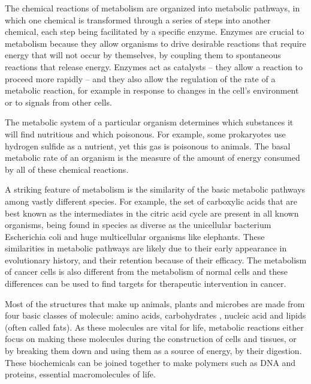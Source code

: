 The chemical reactions of metabolism are organized into metabolic pathways, in which one chemical is transformed through a series of steps into another chemical, each step being facilitated by a specific enzyme. Enzymes are crucial to metabolism because they allow organisms to drive desirable reactions that require energy that will not occur by themselves, by coupling them to spontaneous reactions that release energy. Enzymes act as catalysts -- they allow a reaction to proceed more rapidly -- and they also allow the regulation of the rate of a metabolic reaction, for example in response to changes in the cell's environment or to signals from other cells.

The metabolic system of a particular organism determines which substances it will find nutritious and which poisonous. For example, some prokaryotes use hydrogen sulfide as a nutrient, yet this gas is poisonous to animals. The basal metabolic rate of an organism is the measure of the amount of energy consumed by all of these chemical reactions.

A striking feature of metabolism is the similarity of the basic metabolic pathways among vastly different species. For example, the set of carboxylic acids that are best known as the intermediates in the citric acid cycle are present in all known organisms, being found in species as diverse as the unicellular bacterium Escherichia coli and huge multicellular organisms like elephants. These similarities in metabolic pathways are likely due to their early appearance in evolutionary history, and their retention because of their efficacy. The metabolism of cancer cells is also different from the metabolism of normal cells and these differences can be used to find targets for therapeutic intervention in cancer.

Most of the structures that make up animals, plants and microbes are made from four basic classes of molecule: amino acids, carbohydrates , nucleic acid and lipids (often called fats). As these molecules are vital for life, metabolic reactions either focus on making these molecules during the construction of cells and tissues, or by breaking them down and using them as a source of energy, by their digestion. These biochemicals can be joined together to make polymers such as DNA and proteins, essential macromolecules of life.

\onecolumn

